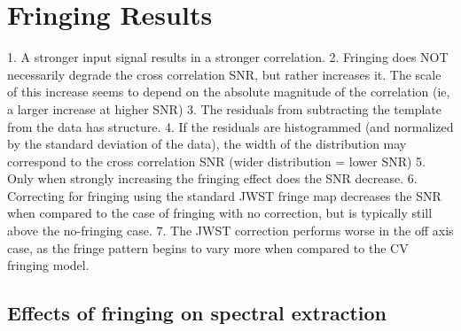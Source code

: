\section{Fringing Results}
1. A stronger input signal results in a stronger correlation.
2. Fringing does NOT necessarily degrade the cross correlation SNR, but rather increases it. The scale of this increase seems to depend on the absolute magnitude of the correlation (ie, a larger increase at higher SNR)
3. The residuals from subtracting the template from the data has structure.
4. If the residuals are histogrammed (and normalized by the standard deviation of the data), the width of the distribution may correspond to the cross correlation SNR (wider distribution = lower SNR)
5. Only when strongly increasing the fringing effect does the SNR decrease.
6. Correcting for fringing using the standard JWST fringe map decreases the SNR when compared to the case of fringing with no correction, but is typically still above the no-fringing case.
7. The JWST correction performs worse in the off axis case, as the fringe pattern begins to vary more when compared to the CV fringing model.
\subsection{Effects of fringing on spectral extraction}